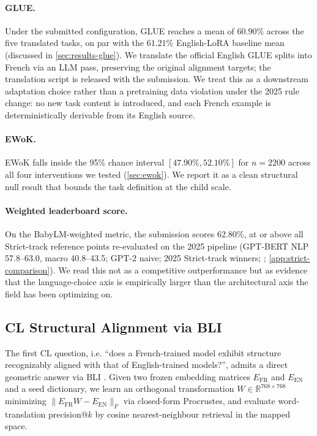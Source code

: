 \documentclass[11pt]{article}
\begin{document}
\paragraph{GLUE.}
Under the submitted configuration, GLUE reaches a mean of $60.90$\% across the five translated tasks, on par with the $61.21$\% English-LoRA baseline mean (discussed in \autoref{sec:results-glue}). We translate the official English GLUE splits into French via an LLM pass, preserving the original alignment targets; the translation script is released with the submission. We treat this as a downstream adaptation choice rather than a pretraining data violation under the 2025 rule change: no new task content is introduced, and each French example is deterministically derivable from its English source.

\paragraph{EWoK.}
EWoK falls inside the 95\% chance interval $[47.90\%, 52.10\%]$ for $n\!=\!2200$ across all four interventions we tested (\autoref{sec:ewok}). We report it as a clean structural null result that bounds the task definition at the child scale.

\paragraph{Weighted leaderboard score.}
On the BabyLM-weighted metric, the submission scores 62.80\%, at or above all Strict-track reference points re-evaluated on the 2025 pipeline (GPT-BERT \citealp{charpentier2024gptbert} NLP 57.8--63.0, macro 40.8--43.5; GPT-2 naive; 2025 Strict-track winners; \citealp{charpentier2025babylm}; \autoref{app:strict-comparison}). We read this not as a competitive outperformance but as evidence that the language-choice axis is empirically larger than the architectural axis the field has been optimizing on.

\subsection{CL Structural Alignment via BLI}
\label{sec:results-bli}

The first CL question, i.e. \enquote{does a French-trained model exhibit structure recognizably aligned with that of English-trained models?}, admits a direct geometric answer via BLI \citep{mikolov2013bli,conneau2018muse}. Given two frozen embedding matrices $E_{\mathrm{FR}}$ and $E_{\mathrm{EN}}$ and a seed dictionary, we learn an orthogonal transformation $W \in \mathbb{R}^{768 \times 768}$ minimizing $\|E_{\mathrm{FR}} W - E_{\mathrm{EN}}\|_F$ via closed-form Procrustes, and evaluate word-translation precision@$k$ by cosine nearest-neighbour retrieval in the mapped space. 
\end{document}
